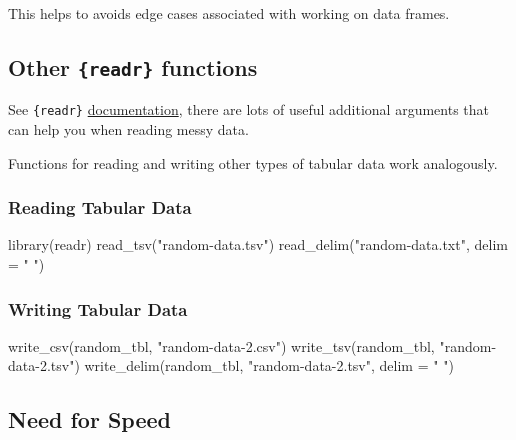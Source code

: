 \documentclass[
  letterpaper,
  DIV=11,
  numbers=noendperiod]{scrreprt}
\newenvironment{Shaded}{\begin{snugshade}}{\end{snugshade}}
\newcommand{\AttributeTok}[1]{\textcolor[rgb]{0.40,0.45,0.13}{#1}}
\newcommand{\FunctionTok}[1]{\textcolor[rgb]{0.28,0.35,0.67}{#1}}
\newcommand{\NormalTok}[1]{\textcolor[rgb]{0.00,0.23,0.31}{#1}}
\newcommand{\StringTok}[1]{\textcolor[rgb]{0.13,0.47,0.30}{#1}}
\begin{document}
This helps to avoids edge cases associated with working on data frames.

\subsection{\texorpdfstring{Other \texttt{\{readr\}}
functions}{Other \{readr\} functions}}\label{other-readr-functions}

See \texttt{\{readr\}}
\href{https://readr.tidyverse.org/}{documentation}, there are lots of
useful additional arguments that can help you when reading messy data.

Functions for reading and writing other types of tabular data work
analogously.

\subsubsection{Reading Tabular Data}\label{reading-tabular-data}

\begin{Shaded}
\begin{Highlighting}[]
\FunctionTok{library}\NormalTok{(readr)}
\FunctionTok{read\_tsv}\NormalTok{(}\StringTok{"random{-}data.tsv"}\NormalTok{)}
\FunctionTok{read\_delim}\NormalTok{(}\StringTok{"random{-}data.txt"}\NormalTok{, }\AttributeTok{delim =} \StringTok{" "}\NormalTok{)}
\end{Highlighting}
\end{Shaded}

\subsubsection{Writing Tabular Data}\label{writing-tabular-data}

\begin{Shaded}
\begin{Highlighting}[]
\FunctionTok{write\_csv}\NormalTok{(random\_tbl, }\StringTok{"random{-}data{-}2.csv"}\NormalTok{)}
\FunctionTok{write\_tsv}\NormalTok{(random\_tbl, }\StringTok{"random{-}data{-}2.tsv"}\NormalTok{)}
\FunctionTok{write\_delim}\NormalTok{(random\_tbl, }\StringTok{"random{-}data{-}2.tsv"}\NormalTok{, }\AttributeTok{delim =} \StringTok{" "}\NormalTok{)}
\end{Highlighting}
\end{Shaded}

\subsection{Need for Speed}\label{need-for-speed}
\end{document}
